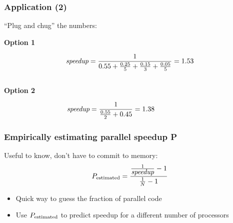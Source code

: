 \documentclass[aspectratio=43]{beamer}
\begin{document}
\begin{frame}
  \frametitle{Application (2)}

\begin{minipage}{.8\textwidth}
  \hspace*{2em} ``Plug and chug'' the numbers:\\[1em]
\hspace*{.2\textwidth}\begin{minipage}{.8\textwidth}
  {\bf Option 1} \vspace*{-2em}

  \[ \mbox{\em speedup} = \frac{1}{0.55 + \frac{0.25}{5} + \frac{0.15}{3} + \frac{0.05}{5}}
    = 1.53  \]
~\\[1em]
  {\bf Option 2} \vspace*{-2em}

   \[\mbox{\em speedup} = \frac{1}{\frac{0.55}{2} + 0.45} = 1.38 \hspace*{5.5em}\]
\end{minipage}
\end{minipage}

\end{frame}

\begin{frame}
  \frametitle{Empirically estimating parallel speedup P}

  \hspace*{2em} Useful to know, don't have to commit to memory:
  \vfill
  \[P_{\mbox{\scriptsize estimated}} = \frac{\frac{1}{\mbox{\em speedup}}-1}{\frac{1}{N}-1}\]
  \vfill
  \hspace*{2em} \begin{minipage}{.8\textwidth} \begin{itemize}
    \item Quick way to guess the fraction of parallel code
    \item Use $P_{\mbox{\scriptsize estimated}}$ to predict speedup for a different number of processors
  \end{itemize} \end{minipage}
\end{frame}
\end{document}
